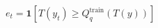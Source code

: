 \documentclass[border=6pt]{standalone}
\begin{document}
$\displaystyle
e_t = \mathbf{1}\!\left[T(y_t) \ge Q_q^{\mathrm{train}}\!\left(T(y)\right)\right]
$
\end{document}
